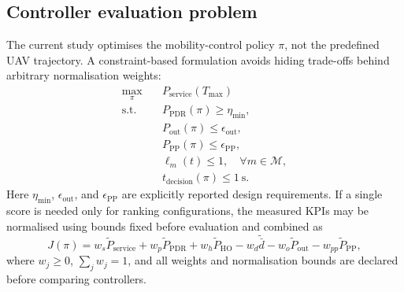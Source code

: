 \subsection{Controller evaluation problem}

The current study optimises the mobility-control policy $\pi$, not the
predefined UAV trajectory. A constraint-based formulation avoids hiding
trade-offs behind arbitrary normalisation weights:
\begin{align}
 \max_{\pi}\quad & P_{\mathrm{service}}(T_{\max}) \\
 \text{s.t.}\quad
 &P_{\mathrm{PDR}}(\pi)\geq \eta_{\min}, \\
 &P_{\mathrm{out}}(\pi)\leq \epsilon_{\mathrm{out}}, \\
 &P_{\mathrm{PP}}(\pi)\leq \epsilon_{\mathrm{PP}}, \\
 &\ell_m(t)\leq 1, \quad \forall m\in\mathcal{M}, \\
 &t_{\mathrm{decision}}(\pi)\leq 1\ \mathrm{s}.
 \label{eq:controller-problem}
\end{align}
Here $\eta_{\min}$, $\epsilon_{\mathrm{out}}$, and
$\epsilon_{\mathrm{PP}}$ are explicitly reported design requirements. If a
single score is needed only for ranking configurations, the measured KPIs may
be normalised using bounds fixed before evaluation and combined as
\begin{equation}
 J(\pi)=w_s\widetilde P_{\mathrm{service}}
 +w_p\widetilde P_{\mathrm{PDR}}
 +w_h\widetilde P_{\mathrm{HO}}
 -w_d\widetilde{\bar d}
 -w_o\widetilde P_{\mathrm{out}}
 -w_{pp}\widetilde P_{\mathrm{PP}},
 \label{eq:optional-score}
\end{equation}
where $w_j\geq0$, $\sum_jw_j=1$, and all weights and normalisation bounds are
declared before comparing controllers.

